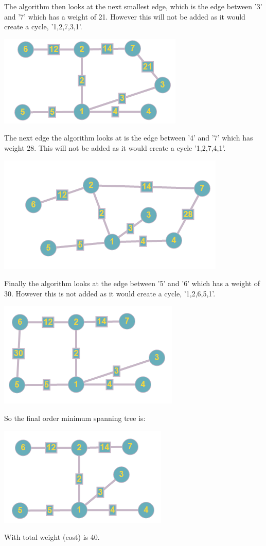 \documentclass{article}
\begin{document}
The algorithm then looks at the next smallest edge, which is the edge between '3' and '7' which has a weight of 21. However this will not be added as it would create a cycle, '1,2,7,3,1'. 
\newline
\begin{center}
\includegraphics{b23c1}
\end{center}
The next edge the algorithm looks at is the edge between '4' and '7' which has weight 28. This will not be added as it would create a cycle '1,2,7,4,1'.
\begin{center}
\includegraphics{b237}
\end{center}
Finally the algorithm looks at the edge between '5' and '6' which has a weight of 30. However this is not added as it would create a cycle, '1,2,6,5,1'.
\newline
\begin{center}
\includegraphics{b23c2}
\end{center}
So the final order minimum spanning tree is:
\begin{center}
\includegraphics{b236}
\end{center}
With total weight (cost) is 40.
\end{document}
